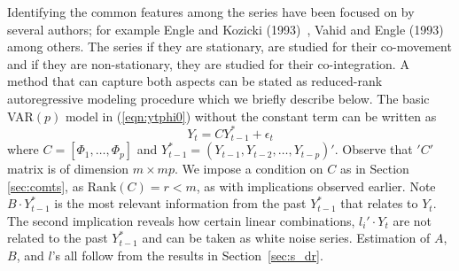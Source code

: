 Identifying the common features among the series have been focused on by several authors; for example Engle and Kozicki (1993)~\cite{koz93}, Vahid and Engle (1993)~\cite{vah93} among others. The series if they are stationary, are studied for their co-movement and if they are non-stationary, they are studied for their co-integration. A method that can capture both aspects can be stated as reduced-rank autoregressive modeling procedure which we briefly describe below. The basic VAR$(p)$ model in (\ref{eqn:ytphi0}) without the constant term can be written as
	\begin{equation}\label{eqn:2ytcyt}
	Y_t = CY_{t-1}^*+\epsilon_t
	\end{equation}
where $C=[\Phi_1,\ldots,\Phi_p]$ and $Y_{t-1}^*=(Y_{t-1},Y_{t-2},\ldots,Y_{t-p})'$. Observe that $'C'$ matrix is of dimension $m \times mp$. We impose a condition on $C$ as in Section \ref{sec:comts}, as $\text{Rank}(C)=r < m$, as with implications observed earlier. Note $B\cdot Y_{t-1}^*$ is the most relevant information from the past $Y_{t-1}^*$ that relates to $Y_t$. The second implication reveals how certain linear combinations, $l_i' \cdot Y_t$ are not related to the past $Y_{t-1}^*$ and can be taken as white noise series. Estimation of $A$, $B$, and $l$'s all follow from the results in Section~\ref{sec:s_dr}. 


